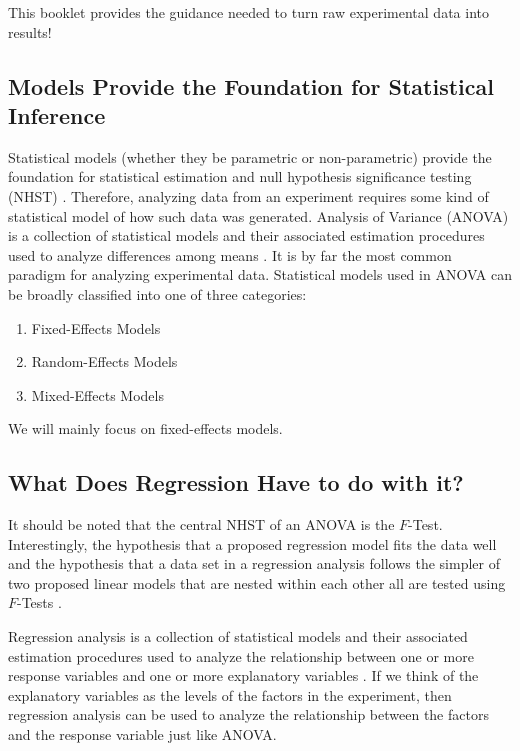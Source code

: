 \documentclass[
]{book}
\providecommand{\tightlist}{%
  \setlength{\itemsep}{0pt}\setlength{\parskip}{0pt}}
\begin{document}
This booklet provides the guidance needed to turn raw experimental data into results!

\hypertarget{models-provide-the-foundation-for-statistical-inference}{%
\subsection{Models Provide the Foundation for Statistical Inference}\label{models-provide-the-foundation-for-statistical-inference}}

Statistical models (whether they be parametric or non-parametric) provide the foundation for statistical estimation and null hypothesis significance testing (NHST) \autocite{stat-model}. Therefore, analyzing data from an experiment requires some kind of statistical model of how such data was generated. Analysis of Variance (ANOVA) is a collection of statistical models and their associated estimation procedures used to analyze differences among means \autocite{ANOVA}. It is by far the most common paradigm for analyzing experimental data. Statistical models used in ANOVA can be broadly classified into one of three categories:

\begin{enumerate}
\def\labelenumi{\arabic{enumi}.}
\tightlist
\item
  Fixed-Effects Models\\
\item
  Random-Effects Models\\
\item
  Mixed-Effects Models
\end{enumerate}

We will mainly focus on fixed-effects models.

\hypertarget{what-does-regression-have-to-do-with-it}{%
\subsection{What Does Regression Have to do with it?}\label{what-does-regression-have-to-do-with-it}}

It should be noted that the central NHST of an ANOVA is the \(F\)-Test. Interestingly, the hypothesis that a proposed regression model fits the data well and the hypothesis that a data set in a regression analysis follows the simpler of two proposed linear models that are nested within each other all are tested using \(F\)-Tests \autocite{F-test}.

Regression analysis is a collection of statistical models and their associated estimation procedures used to analyze the relationship between one or more response variables and one or more explanatory variables \autocite{regression-analysis}. If we think of the explanatory variables as the levels of the factors in the experiment, then regression analysis can be used to analyze the relationship between the factors and the response variable just like ANOVA.
\end{document}
